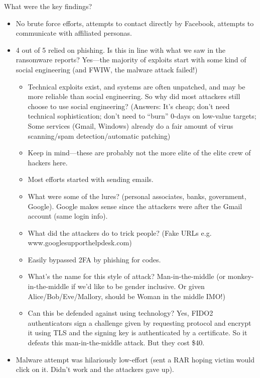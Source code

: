 \documentclass[11pt]{article}
\begin{document}
    What were the key findings?
    \begin{itemize}
        \item No brute force efforts, attempts to contact directly by Facebook, attempts to communicate with affiliated personas.
        \item 4 out of 5 relied on phishing. Is this in line with what we saw in the ransomware reports? Yes---the majority of exploits start with some kind of social engineering (and FWIW, the malware attack failed!)
        \begin{itemize}    
            \item Technical exploits exist, and systems are often unpatched, and may be more reliable than social engineering. So why did most attackers still choose to use social engineering? (Answers: It's cheap; don't need technical sophistication; don't need to ``burn'' 0-days on low-value targets; Some services (Gmail, Windows) already do a fair amount of virus scanning/spam detection/automatic patching)
            \item Keep in mind---these are probably not the more elite of the elite crew of hackers here. 
            \item Most efforts started with sending emails.
            \item What were some of the lures? (personal associates, banks, government, Google). Google makes sense since the attackers were after the Gmail account (same login info). 
            \item What did the attackers do to trick people? (Fake URLs e.g. www.googlesupporthelpdesk.com)
            \item Easily bypassed 2FA by phishing for codes.
            \item What's the name for this style of attack? Man-in-the-middle (or monkey-in-the-middle if we'd like to be gender inclusive. Or given Alice/Bob/Eve/Mallory, should be Woman in the middle IMO!)
            \item Can this be defended against using technology? Yes, FIDO2 authenticators sign a challenge given by requesting protocol and encrypt it using TLS and the signing key is authenticated by a certificate. So it defeats this man-in-the-middle attack. But they cost \$40.
        \end{itemize}
        \item Malware attempt was hilariously low-effort (sent a RAR hoping victim would click on it. Didn't work and the attackers gave up).
    \end{itemize}
\end{document}

